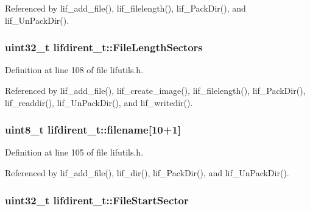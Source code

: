Referenced by lif\+\_\+add\+\_\+file(), lif\+\_\+filelength(), lif\+\_\+\+Pack\+Dir(), and lif\+\_\+\+Un\+Pack\+Dir().

\subsubsection[{\texorpdfstring{File\+Length\+Sectors}{FileLengthSectors}}]{\setlength{\rightskip}{0pt plus 5cm}uint32\+\_\+t lifdirent\+\_\+t\+::\+File\+Length\+Sectors}\hypertarget{structlifdirent__t_a0770652809bb32a115c7f30035a13208}{}\label{structlifdirent__t_a0770652809bb32a115c7f30035a13208}


Definition at line 108 of file lifutils.\+h.



Referenced by lif\+\_\+add\+\_\+file(), lif\+\_\+create\+\_\+image(), lif\+\_\+filelength(), lif\+\_\+\+Pack\+Dir(), lif\+\_\+readdir(), lif\+\_\+\+Un\+Pack\+Dir(), and lif\+\_\+writedir().

\subsubsection[{\texorpdfstring{filename}{filename}}]{\setlength{\rightskip}{0pt plus 5cm}uint8\+\_\+t lifdirent\+\_\+t\+::filename\mbox{[}10+1\mbox{]}}\hypertarget{structlifdirent__t_ac0d5353d2e81494997b15597377de032}{}\label{structlifdirent__t_ac0d5353d2e81494997b15597377de032}


Definition at line 105 of file lifutils.\+h.



Referenced by lif\+\_\+add\+\_\+file(), lif\+\_\+dir(), lif\+\_\+\+Pack\+Dir(), and lif\+\_\+\+Un\+Pack\+Dir().

\subsubsection[{\texorpdfstring{File\+Start\+Sector}{FileStartSector}}]{\setlength{\rightskip}{0pt plus 5cm}uint32\+\_\+t lifdirent\+\_\+t\+::\+File\+Start\+Sector}\hypertarget{structlifdirent__t_a87df04d1aa76daa4b9500f2f2e44ecaa}{}\label{structlifdirent__t_a87df04d1aa76daa4b9500f2f2e44ecaa}


